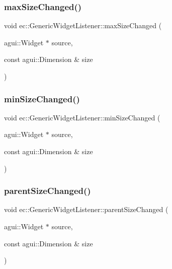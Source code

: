 \subsubsection{\texorpdfstring{max\+Size\+Changed()}{maxSizeChanged()}}
{\footnotesize\ttfamily void ec\+::\+Generic\+Widget\+Listener\+::max\+Size\+Changed (\begin{DoxyParamCaption}\item[{agui\+::\+Widget $\ast$}]{source,  }\item[{const agui\+::\+Dimension \&}]{size }\end{DoxyParamCaption})\hspace{0.3cm}{\ttfamily [override]}}

\mbox{\label{classec_1_1_generic_widget_listener_af3cb291bf020116053ee7955d40bc786}} 
\subsubsection{\texorpdfstring{min\+Size\+Changed()}{minSizeChanged()}}
{\footnotesize\ttfamily void ec\+::\+Generic\+Widget\+Listener\+::min\+Size\+Changed (\begin{DoxyParamCaption}\item[{agui\+::\+Widget $\ast$}]{source,  }\item[{const agui\+::\+Dimension \&}]{size }\end{DoxyParamCaption})\hspace{0.3cm}{\ttfamily [override]}}

\mbox{\label{classec_1_1_generic_widget_listener_ac028b637c04e199f30769df5bc30a0b2}} 
\subsubsection{\texorpdfstring{parent\+Size\+Changed()}{parentSizeChanged()}}
{\footnotesize\ttfamily void ec\+::\+Generic\+Widget\+Listener\+::parent\+Size\+Changed (\begin{DoxyParamCaption}\item[{agui\+::\+Widget $\ast$}]{source,  }\item[{const agui\+::\+Dimension \&}]{size }\end{DoxyParamCaption})\hspace{0.3cm}{\ttfamily [override]}}

